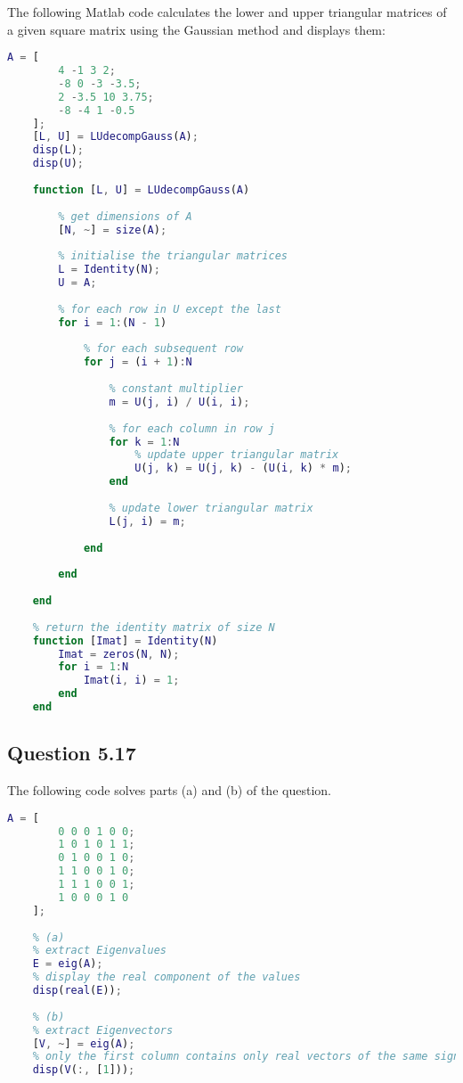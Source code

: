 \documentclass[12pt]{article}
\begin{document}
\indent The following Matlab code calculates the lower and upper triangular matrices of a given square matrix using the Gaussian method and displays them:

\begin{lstlisting}[language=Matlab]
    A = [
        4 -1 3 2;
        -8 0 -3 -3.5;
        2 -3.5 10 3.75;
        -8 -4 1 -0.5
    ];
    [L, U] = LUdecompGauss(A);
    disp(L);
    disp(U);
    
    function [L, U] = LUdecompGauss(A)
        
        % get dimensions of A
        [N, ~] = size(A);
        
        % initialise the triangular matrices
        L = Identity(N);
        U = A;
        
        % for each row in U except the last
        for i = 1:(N - 1)
            
            % for each subsequent row 
            for j = (i + 1):N
                
                % constant multiplier
                m = U(j, i) / U(i, i);
                
                % for each column in row j
                for k = 1:N
                    % update upper triangular matrix
                    U(j, k) = U(j, k) - (U(i, k) * m);
                end
                
                % update lower triangular matrix
                L(j, i) = m;
                
            end
            
        end
        
    end
    
    % return the identity matrix of size N
    function [Imat] = Identity(N)
        Imat = zeros(N, N);
        for i = 1:N
            Imat(i, i) = 1;
        end
    end
\end{lstlisting}

\subsection*{Question 5.17}

\noindent The following code solves parts (a) and (b) of the question.

\begin{lstlisting}[language=Matlab]
    A = [
        0 0 0 1 0 0;
        1 0 1 0 1 1;
        0 1 0 0 1 0;
        1 1 0 0 1 0;
        1 1 1 0 0 1;
        1 0 0 0 1 0
    ];
    
    % (a)
    % extract Eigenvalues
    E = eig(A);
    % display the real component of the values
    disp(real(E));
    
    % (b)
    % extract Eigenvectors
    [V, ~] = eig(A);
    % only the first column contains only real vectors of the same sign
    disp(V(:, [1]));
\end{lstlisting}
\end{document}
